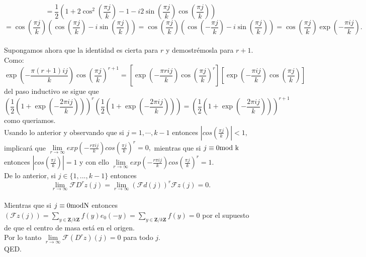 \documentclass[a4paper,openright,10pt]{article}
\begin{document}
$$=\frac{1}{2}(1+2\cos ^{2} (\frac{\pi j}{k})-1-i2\sin (\frac{\pi j}{k})\cos(\frac{\pi j}{k}))
$$
$$
=\cos(\frac{\pi j}{k})(\cos(\frac{\pi j}{k})-i\sin(\frac{\pi j}{k}))
=\cos(\frac{\pi j}{k})(\cos(-\frac{\pi j}{k})-i\sin(\frac{\pi j}{k}))
=\cos(\frac{\pi j}{k})\exp(-\frac{\pi ij}{k}).
$$\\
Supongamos ahora que la identidad es cierta para $r$ y demostr\'emosla para $r+1.$ Como:$$
\exp(-\frac{\pi (r+1)ij}{k})\cos(\frac{\pi j}{k})^{r+1}
=[\exp(-\frac{\pi rij}{k})\cos(\frac{\pi j}{k})^{r}
][\exp(-\frac{\pi ij}{k})\cos(\frac{\pi j}{k})]
$$ del paso inductivo se sigue que $$
({\frac{1}{2}(1+\exp(-\frac{2\pi ij}{k}))})^{r}({\frac{1}{2}(1+\exp(-\frac{2\pi ij}{k}))})=({\frac{1}{2}(1+\exp(-\frac{2\pi ij}{k}))})^{r+1}
$$ como queriamos.\\
Usando lo anterior y observando que si $j=1,\cdots,k-1$ entonces $|cos(\frac{\pi j}{k})|<1,$ implicar\'a que $\lim\limits_{r\rightarrow \infty} exp(-\frac{r\pi ij}{k})cos(\frac{\pi j}{k})^{r}= 0,$ mientras que si $j \equiv 0 \textnormal{mod k}$ entonces $|cos(\frac{\pi j}{k})|=1$ y con ello $\lim\limits_{r\rightarrow \infty} exp(-\frac{r\pi ij}{k})cos(\frac{\pi j}{k})^{r}= 1.$
\\
De lo anterior, si $j\in \{1,...,k-1\}$ entonces $$
\lim\limits_{r\rightarrow \infty}\mathcal{F}D^{r}z(j)=\lim\limits_{r\rightarrow \infty}(\mathcal{F}d(j))^{r}\mathcal{F}z(j)=0.
$$\\
Mientras que si $j\equiv 0 \textnormal{modN}$ entonces $(\mathcal{F}z(j))=\sum\limits_{y\in \mathbf{Z}/k\mathbf{Z}}f(y)e_{0}(-y)=\sum\limits_{y\in \mathbf{Z}/k\mathbf{Z}}f(y)=0$ por el supuesto de que el centro de masa est\'a en el origen.\\
Por lo tanto $\lim\limits_{r\rightarrow \infty}\mathcal{F}(D^{r}z)(j)=0$ para todo $j.$ \\
QED.
\end{document}
